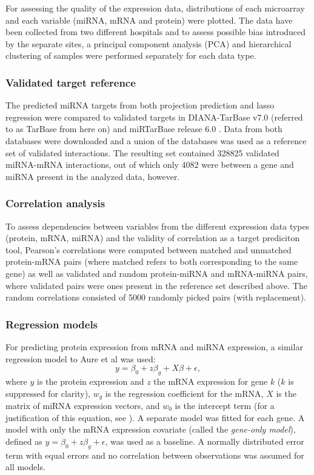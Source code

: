 For assessing the quality of the expression data, distributions of each
microarray and each variable (miRNA, mRNA and protein) were plotted. The data
have been collected from two different hospitals and to assess possible bias
introduced by the separate sites, a principal component analysis (PCA) and
hierarchical clustering of samples were performed separately for each data
type.



\subsubsection{Validated target reference}

The predicted miRNA targets from both projection prediction and lasso
regression were compared to validated targets in DIANA-TarBase v7.0
\citep{Vlachos2015} (referred to as TarBase from here on) and miRTarBase
release 6.0 \citep{Chou2016}. Data from both databases were downloaded and a
union of the databases was used as a reference set of validated interactions.
The resulting set contained 328825 validated miRNA-mRNA interactions, out of
which only 4082 were between a gene and miRNA present in the analyzed data,
however.




\subsubsection{Correlation analysis}

To assess dependencies between variables from the different expression data
types (protein, mRNA, miRNA) and the validity of correlation as a target
prediciton tool, Pearson's correlations were computed between matched and
unmatched protein-mRNA pairs (where matched refers to both corresponding to
the same gene) as well as validated and random protein-miRNA and mRNA-miRNA
pairs, where validated pairs were ones present in the reference set described
above. The random correlations consisted of 5000 randomly picked pairs (with
replacement).




\subsubsection{Regression models}

For predicting protein expression from mRNA and miRNA expression, a similar
regression model to Aure et al was used:
\begin{equation}
	\label{eq:reg-model}
	y = \beta_0 + z \beta_g + X \beta + \epsilon,
\end{equation}
where $y$ is the protein expression and $z$ the
mRNA expression for gene $k$ ($k$ is suppressed for clarity), $w_g$
is the regression coefficient for the mRNA, $X$ is the matrix of miRNA
expression vectors, and $w_0$ is the intercept term
(for a justification of this equation, see \citep{Aure2015}).
A separate model was fitted for each gene.
A model with only the mRNA expression covariate (called the \emph{gene-only model}),
defined as $y = \beta_0 + z \beta_g + \epsilon$, was used as a baseline.
A normally distributed error term with equal errors and no correlation
between observations was assumed for all models.

